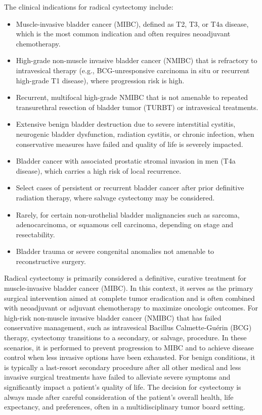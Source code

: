 The clinical indications for radical cystectomy include:

\begin{itemize}
  \item Muscle-invasive bladder cancer (MIBC), defined as T2, T3, or T4a disease, which is the most common indication and often requires neoadjuvant chemotherapy.
  \item High-grade non-muscle invasive bladder cancer (NMIBC) that is refractory to intravesical therapy (e.g., BCG-unresponsive carcinoma in situ or recurrent high-grade T1 disease), where progression risk is high.
  \item Recurrent, multifocal high-grade NMIBC that is not amenable to repeated transurethral resection of bladder tumor (TURBT) or intravesical treatments.
  \item Extensive benign bladder destruction due to severe interstitial cystitis, neurogenic bladder dysfunction, radiation cystitis, or chronic infection, when conservative measures have failed and quality of life is severely impacted.
  \item Bladder cancer with associated prostatic stromal invasion in men (T4a disease), which carries a high risk of local recurrence.
  \item Select cases of persistent or recurrent bladder cancer after prior definitive radiation therapy, where salvage cystectomy may be considered.
  \item Rarely, for certain non-urothelial bladder malignancies such as sarcoma, adenocarcinoma, or squamous cell carcinoma, depending on stage and resectability.
  \item Bladder trauma or severe congenital anomalies not amenable to reconstructive surgery.
\end{itemize}

Radical cystectomy is primarily considered a definitive, curative treatment for muscle-invasive bladder cancer (MIBC). In this context, it serves as the primary surgical intervention aimed at complete tumor eradication and is often combined with neoadjuvant or adjuvant chemotherapy to maximize oncologic outcomes. For high-risk non-muscle invasive bladder cancer (NMIBC) that has failed conservative management, such as intravesical Bacillus Calmette-Gu\'erin (BCG) therapy, cystectomy transitions to a secondary, or salvage, procedure. In these scenarios, it is performed to prevent progression to MIBC and to achieve disease control when less invasive options have been exhausted. For benign conditions, it is typically a last-resort secondary procedure after all other medical and less invasive surgical treatments have failed to alleviate severe symptoms and significantly impact a patient's quality of life. The decision for cystectomy is always made after careful consideration of the patient's overall health, life expectancy, and preferences, often in a multidisciplinary tumor board setting.

